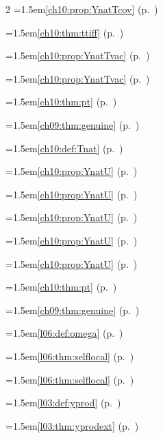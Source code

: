 \begin{multicols}{2}
\hangindent=1.5em\quad \ref{ch10:prop:YnatTcov} (p.~\pageref{ch10:prop:YnatTcov})\par
\hangindent=1.5em\quad \ref{ch10:thm:ttiff} (p.~\pageref{ch10:thm:ttiff})\par
\hangindent=1.5em\quad \ref{ch10:prop:YnatTvac} (p.~\pageref{ch10:prop:YnatTvac})\par
\hangindent=1.5em\quad \ref{ch10:prop:YnatTvac} (p.~\pageref{ch10:prop:YnatTvac})\par
\hangindent=1.5em\quad \ref{ch10:thm:pt} (p.~\pageref{ch10:thm:pt})\par
\hangindent=1.5em\quad \ref{ch09:thm:genuine} (p.~\pageref{ch09:thm:genuine})\par
\hangindent=1.5em\quad \ref{ch10:def:Tnat} (p.~\pageref{ch10:def:Tnat})\par
\hangindent=1.5em\quad \ref{ch10:prop:YnatU} (p.~\pageref{ch10:prop:YnatU})\par
\hangindent=1.5em\quad \ref{ch10:prop:YnatU} (p.~\pageref{ch10:prop:YnatU})\par
\hangindent=1.5em\quad \ref{ch10:prop:YnatU} (p.~\pageref{ch10:prop:YnatU})\par
\hangindent=1.5em\quad \ref{ch10:prop:YnatU} (p.~\pageref{ch10:prop:YnatU})\par
\hangindent=1.5em\quad \ref{ch10:prop:YnatU} (p.~\pageref{ch10:prop:YnatU})\par
\hangindent=1.5em\quad \ref{ch10:thm:pt} (p.~\pageref{ch10:thm:pt})\par
\hangindent=1.5em\quad \ref{ch09:thm:genuine} (p.~\pageref{ch09:thm:genuine})\par
\hangindent=1.5em\quad \ref{l06:def:omega} (p.~\pageref{l06:def:omega})\par
\hangindent=1.5em\quad \ref{l06:thm:selflocal} (p.~\pageref{l06:thm:selflocal})\par
\hangindent=1.5em\quad \ref{l06:thm:selflocal} (p.~\pageref{l06:thm:selflocal})\par
\hangindent=1.5em\quad \ref{l03:def:yprod} (p.~\pageref{l03:def:yprod})\par
\hangindent=1.5em\quad \ref{l03:thm:yprodext} (p.~\pageref{l03:thm:yprodext})\par

\end{multicols}
